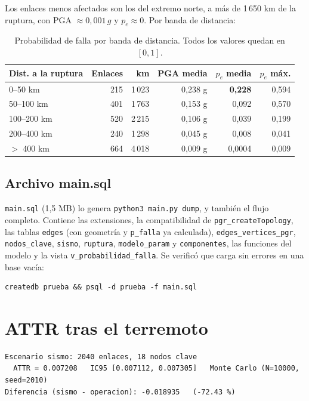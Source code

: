 \documentclass[11pt,a4paper]{article}
\newcommand{\cod}[1]{\texttt{#1}}
\begin{document}
Los enlaces menos afectados son los del extremo norte, a más de 1\,650 km de la ruptura, con
PGA $\approx 0{,}001\,g$ y $p_e \approx 0$. Por banda de distancia:

\begin{table}[h]
\centering
\begin{tabular}{lrrrrr}
\toprule
Dist. a la ruptura & Enlaces & km & PGA media & $p_e$ media & $p_e$ máx. \\
\midrule
0--50 km & 215 & 1\,023 & 0,238 g & \textbf{0,228} & 0,594 \\
50--100 km & 401 & 1\,763 & 0,153 g & 0,092 & 0,570 \\
100--200 km & 520 & 2\,215 & 0,106 g & 0,039 & 0,199 \\
200--400 km & 240 & 1\,298 & 0,045 g & 0,008 & 0,041 \\
$>$ 400 km & 664 & 4\,018 & 0,009 g & 0,0004 & 0,009 \\
\bottomrule
\end{tabular}
\caption{Probabilidad de falla por banda de distancia. Todos los valores quedan en $[0, 1]$.}
\end{table}

\subsection{Archivo main.sql}
\cod{main.sql} (1,5 MB) lo genera \cod{python3 main.py dump}, y también el flujo completo. Contiene
las extensiones, la compatibilidad de \cod{pgr\_createTopology}, las tablas \cod{edges} (con
geometría y \cod{p\_falla} ya calculada), \cod{edges\_vertices\_pgr}, \cod{nodos\_clave},
\cod{sismo}, \cod{ruptura}, \cod{modelo\_param} y \cod{componentes}, las funciones del modelo y la
vista \cod{v\_probabilidad\_falla}. Se verificó que carga sin errores en una base vacía:

\begin{Verbatim}
createdb prueba && psql -d prueba -f main.sql
\end{Verbatim}

\section{ATTR tras el terremoto}
\begin{Verbatim}
Escenario sismo: 2040 enlaces, 18 nodos clave
  ATTR = 0.007208   IC95 [0.007112, 0.007305]   Monte Carlo (N=10000, seed=2010)
Diferencia (sismo - operacion): -0.018935   (-72.43 %)
\end{Verbatim}
\end{document}
